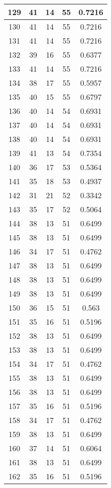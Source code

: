 \documentclass[letterpaper, 12pt]{article}
\begin{document}
\begin{longtable}{|c|c|c|c|c|}
\hline
129 & 41 & 14 & 55 & 0.7216 \\
\hline
130 & 41 & 14 & 55 & 0.7216 \\
\hline
131 & 41 & 14 & 55 & 0.7216 \\
\hline
132 & 39 & 16 & 55 & 0.6377 \\
\hline
133 & 41 & 14 & 55 & 0.7216 \\
\hline
134 & 38 & 17 & 55 & 0.5957 \\
\hline
135 & 40 & 15 & 55 & 0.6797 \\
\hline
136 & 40 & 14 & 54 & 0.6931 \\
\hline
137 & 40 & 14 & 54 & 0.6931 \\
\hline
138 & 40 & 14 & 54 & 0.6931 \\
\hline
139 & 41 & 13 & 54 & 0.7354 \\
\hline
140 & 36 & 17 & 53 & 0.5364 \\
\hline
141 & 35 & 18 & 53 & 0.4937 \\
\hline
142 & 31 & 21 & 52 & 0.3342 \\
\hline
143 & 35 & 17 & 52 & 0.5064 \\
\hline
144 & 38 & 13 & 51 & 0.6499 \\
\hline
145 & 38 & 13 & 51 & 0.6499 \\
\hline
146 & 34 & 17 & 51 & 0.4762 \\
\hline
147 & 38 & 13 & 51 & 0.6499 \\
\hline
148 & 38 & 13 & 51 & 0.6499 \\
\hline
149 & 38 & 13 & 51 & 0.6499 \\
\hline
150 & 36 & 15 & 51 & 0.563 \\
\hline
151 & 35 & 16 & 51 & 0.5196 \\
\hline
152 & 38 & 13 & 51 & 0.6499 \\
\hline
153 & 38 & 13 & 51 & 0.6499 \\
\hline
154 & 34 & 17 & 51 & 0.4762 \\
\hline
155 & 38 & 13 & 51 & 0.6499 \\
\hline
156 & 38 & 13 & 51 & 0.6499 \\
\hline
157 & 35 & 16 & 51 & 0.5196 \\
\hline
158 & 34 & 17 & 51 & 0.4762 \\
\hline
159 & 38 & 13 & 51 & 0.6499 \\
\hline
160 & 37 & 14 & 51 & 0.6064 \\
\hline
161 & 38 & 13 & 51 & 0.6499 \\
\hline
162 & 35 & 16 & 51 & 0.5196 \\

\end{longtable}
\end{document}
